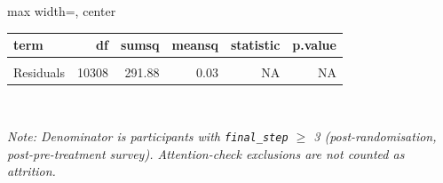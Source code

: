 \renewcommand{\arraystretch}{1.2}
\begin{adjustbox}{max width=\linewidth, center}
\begingroup\fontsize{10}{12}\selectfont

\begin{tabular}{lrrrrr}
\toprule
\textbf{term} & \textbf{df} & \textbf{sumsq} & \textbf{meansq} & \textbf{statistic} & \textbf{p.value}\\
\midrule
\cellcolor{gray!15}{Condition} & \cellcolor{gray!15}{8} & \cellcolor{gray!15}{0.34} & \cellcolor{gray!15}{0.04} & \cellcolor{gray!15}{1.48} & \cellcolor{gray!15}{0.159}\\
Residuals & 10308 & 291.88 & 0.03 & NA & NA\\
\bottomrule
\end{tabular}
\endgroup{}

\end{adjustbox}
\\[3pt]
\begin{minipage}{\linewidth}
\raggedright\footnotesize\textit{Note: Denominator is participants with \texttt{final\_step} $\geq$ 3 (post-randomisation, post-pre-treatment survey). Attention-check exclusions are not counted as attrition.}
\end{minipage}

